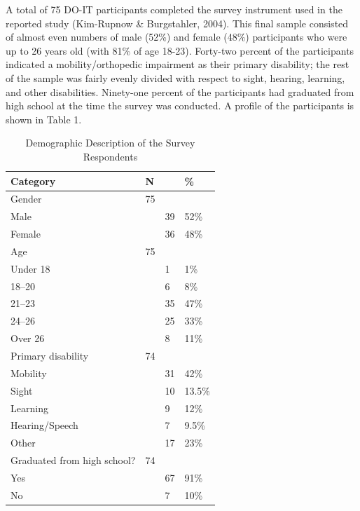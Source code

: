 \documentclass[11.5pt]{sig-alternate} %
\begin{document}
\begin{large}
A total of 75 DO-IT participants completed the survey instrument used in the reported study (Kim-Rupnow \& Burgstahler, 2004). This final sample consisted of almost even numbers of male (52\%) and female (48\%) participants who were up to 26 years old (with 81\% of age 18-23). Forty-two percent of the participants indicated a mobility/orthopedic impairment as their primary disability; the rest of the sample was fairly evenly divided with respect to sight, hearing, learning, and other disabilities. Ninety-one percent of the participants had graduated from high school at the time the survey was conducted. A profile of the participants is shown in Table 1.  

\begin{table}[th]
\caption{Demographic Description of the Survey Respondents}
\begin{tabular}{llll}
\hline
Category & N & & \% \\ \hline
Gender & 75 & & \\
\hspace{1em} Male & & 39 & 52\% \\
\hspace{1em} Female & & 36 & 48\% \\ \hline
Age & 75 & & \\
\hspace{1em} Under 18 & & 1 & 1\% \\
\hspace{1em} 18–20 & & 6 & 8\% \\
\hspace{1em} 21–23 & & 35 & 47\% \\
\hspace{1em} 24–26 & & 25 & 33\% \\
\hspace{1em} Over 26 & & 8 & 11\% \\ \hline
Primary disability & 74 & & \\
\hspace{1em} Mobility & & 31 & 42\% \\
\hspace{1em} Sight & & 10 & 13.5\% \\
\hspace{1em} Learning & & 9 & 12\% \\
\hspace{1em} Hearing/Speech & & 7 & 9.5\% \\
\hspace{1em} Other & & 17 & 23\% \\ \hline
Graduated from high school? & 74 & & \\
\hspace{1em} Yes & & 67 & 91\% \\
\hspace{1em} No & & 7 & 10\% \\ \hline
\end{tabular}
\end{table}
 

\end{large}
\end{document}
